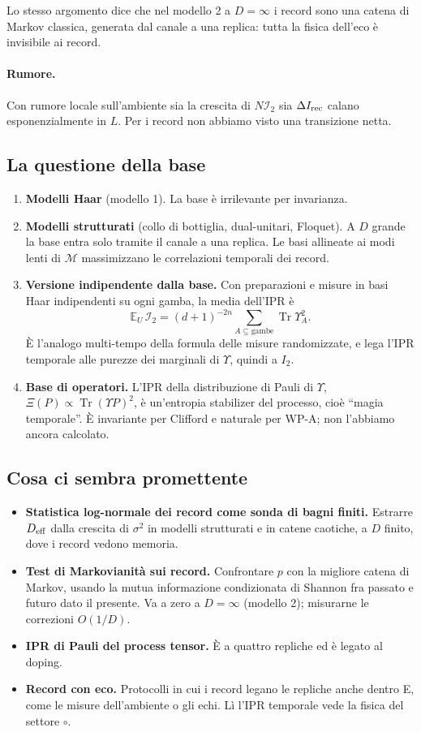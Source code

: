 Lo stesso argomento dice che nel modello 2 a $D=\infty$ i record sono una catena di Markov classica, generata dal canale a una replica: tutta la fisica dell'eco è invisibile ai record.

\paragraph{Rumore.} Con rumore locale sull'ambiente sia la crescita di $N\mathcal I_2$ sia $\Delta I_{\rm rec}$ calano esponenzialmente in $L$. Per i record non abbiamo visto una transizione netta.

\subsection{La questione della base}
\begin{enumerate}[leftmargin=2em]
\item \textbf{Modelli Haar} (modello 1). La base è irrilevante per invarianza.
\item \textbf{Modelli strutturati} (collo di bottiglia, dual-unitari, Floquet). A $D$ grande la base entra solo tramite il canale a una replica. Le basi allineate ai modi lenti di $\mathcal M$ massimizzano le correlazioni temporali dei record.
\item \textbf{Versione indipendente dalla base.} Con preparazioni e misure in basi Haar indipendenti su ogni gamba, la media dell'IPR è
\[
\mathbb E_U\,\mathcal I_2=(d+1)^{-2n}\sum_{A\subseteq\text{gambe}}\operatorname{Tr}\Upsilon_A^2 .
\]
È l'analogo multi-tempo della formula delle misure randomizzate, e lega l'IPR temporale alle purezze dei marginali di $\Upsilon$, quindi a $I_2$.
\item \textbf{Base di operatori.} L'IPR della distribuzione di Pauli di $\Upsilon$, $\Xi(P)\propto\operatorname{Tr}(\Upsilon P)^2$, è un'entropia stabilizer del processo, cioè ``magia temporale''. È invariante per Clifford e naturale per WP-A; non l'abbiamo ancora calcolato.
\end{enumerate}

\subsection{Cosa ci sembra promettente}
\begin{itemize}[leftmargin=1.5em]
\item \textbf{Statistica log-normale dei record come sonda di bagni finiti.} Estrarre $D_{\rm eff}$ dalla crescita di $\sigma^2$ in modelli strutturati e in catene caotiche, a $D$ finito, dove i record vedono memoria.
\item \textbf{Test di Markovianità sui record.} Confrontare $p$ con la migliore catena di Markov, usando la mutua informazione condizionata di Shannon fra passato e futuro dato il presente. Va a zero a $D=\infty$ (modello 2); misurarne le correzioni $O(1/D)$.
\item \textbf{IPR di Pauli del process tensor.} È a quattro repliche ed è legato al doping.
\item \textbf{Record con eco.} Protocolli in cui i record legano le repliche anche dentro E, come le misure dell'ambiente o gli echi. Lì l'IPR temporale vede la fisica del settore $\circ$.
\end{itemize}
